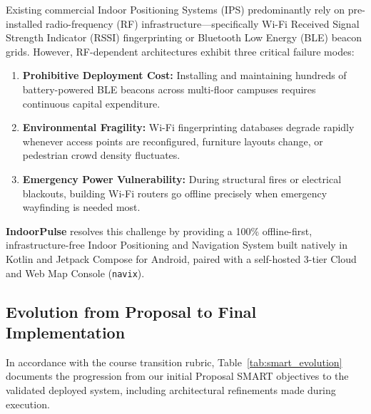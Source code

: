 \documentclass[11pt,a4paper]{article}
\begin{document}
Existing commercial Indoor Positioning Systems (IPS) predominantly rely on pre-installed radio-frequency (RF) infrastructure—specifically Wi-Fi Received Signal Strength Indicator (RSSI) fingerprinting or Bluetooth Low Energy (BLE) beacon grids. However, RF-dependent architectures exhibit three critical failure modes:
\begin{enumerate}
    \item \textbf{Prohibitive Deployment Cost:} Installing and maintaining hundreds of battery-powered BLE beacons across multi-floor campuses requires continuous capital expenditure.
    \item \textbf{Environmental Fragility:} Wi-Fi fingerprinting databases degrade rapidly whenever access points are reconfigured, furniture layouts change, or pedestrian crowd density fluctuates.
    \item \textbf{Emergency Power Vulnerability:} During structural fires or electrical blackouts, building Wi-Fi routers go offline precisely when emergency wayfinding is needed most.
\end{enumerate}

\textbf{IndoorPulse} resolves this challenge by providing a 100\% offline-first, infrastructure-free Indoor Positioning and Navigation System built natively in Kotlin and Jetpack Compose for Android, paired with a self-hosted 3-tier Cloud and Web Map Console (\texttt{navix}).

\subsection{Evolution from Proposal to Final Implementation}
In accordance with the course transition rubric, Table~\ref{tab:smart_evolution} documents the progression from our initial Proposal SMART objectives to the validated deployed system, including architectural refinements made during execution.
\end{document}
